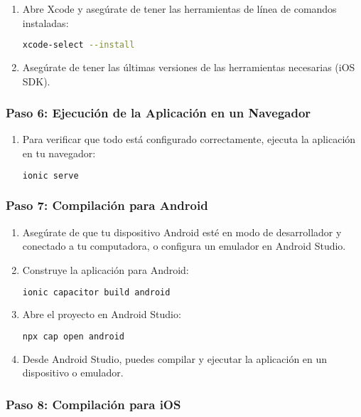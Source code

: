\begin{enumerate}
	\item Abre Xcode y asegúrate de tener las herramientas de línea de comandos instaladas:
	      \begin{lstlisting}[language=bash]
    xcode-select --install
    \end{lstlisting}
	\item Asegúrate de tener las últimas versiones de las herramientas necesarias (iOS SDK).
\end{enumerate}

\subsubsection{Paso 6: Ejecución de la Aplicación en un Navegador}

\begin{enumerate}
	\item Para verificar que todo está configurado correctamente, ejecuta la aplicación en tu navegador:
	      \begin{lstlisting}[language=bash]
    ionic serve
    \end{lstlisting}
\end{enumerate}

\subsubsection{Paso 7: Compilación para Android}

\begin{enumerate}
	\item Asegúrate de que tu dispositivo Android esté en modo de desarrollador y conectado a tu computadora, o configura un emulador en Android Studio.
	\item Construye la aplicación para Android:
	      \begin{lstlisting}[language=bash]
    ionic capacitor build android
    \end{lstlisting}
	\item Abre el proyecto en Android Studio:
	      \begin{lstlisting}[language=bash]
    npx cap open android
    \end{lstlisting}
	\item Desde Android Studio, puedes compilar y ejecutar la aplicación en un dispositivo o emulador.
\end{enumerate}

\subsubsection{Paso 8: Compilación para iOS}

